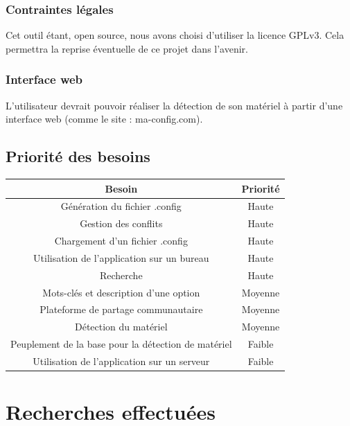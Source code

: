 \documentclass[16pts]{report}
\begin{document}
\subsubsection{Contraintes légales}
\label{sec:Contraintes légales}

Cet outil étant, open source, nous avons choisi d’utiliser la licence GPLv3.
Cela permettra la reprise éventuelle de ce projet dans l’avenir.

\subsubsection{Interface web}
\label{sec:Interface web}

L’utilisateur devrait pouvoir réaliser la détection de son matériel à partir
d’une interface web (comme le site : ma-config.com).

        \subsection{Priorité des besoins}
        \label{sub:Priorité des besoins}

\begin{tabular}{|c|c|}
    \hline
    Besoin & Priorité \\
    \hline
    \hline
    Génération du fichier .config & Haute \\
    \hline
    Gestion des conflits & Haute \\
    \hline
    Chargement d'un fichier .config & Haute \\
    \hline
    Utilisation de l'application sur un bureau & Haute \\
    \hline
    Recherche & Haute \\
    \hline
    Mots-clés et description d'une option & Moyenne \\
    \hline
    Plateforme de partage communautaire & Moyenne \\
    \hline
    Détection du matériel & Moyenne \\
    \hline
    Peuplement de la base pour la détection de matériel & Faible \\
    \hline
    Utilisation de l'application sur un serveur & Faible \\
    \hline
\end{tabular}

    
    \section{Recherches effectuées}
    \label{sec:Recherches effectuées}
\end{document}
